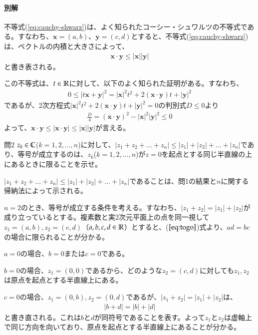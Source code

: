 \paragraph{別解}

不等式(\ref{eq:cauchy-shwarz})は、よく知られたコーシー・シュワルツの不等式である。すなわち、$\bm{x}=(a,b)$、$\bm{y}=(c,d)$とすると、不等式(\ref{eq:cauchy-shwarz})は、ベクトルの内積と大きさによって、
\begin{align}
    \bm{x}\cdot \bm{y}\le|\bm{x}||\bm{y}|\label{eq:cauchy-shwarz0}
\end{align}
と書き表される。

この不等式は、$t\in\mathbb{R}$に対して、以下のよく知られた証明がある。すなわち、
\begin{align*}
    0\le|t\bm{x}+\bm{y}|^2
    =|\bm{x}|^2t^2+2(\bm{x}\cdot\bm{y})t+|\bm{y}|^2
\end{align*}
であるが、2次方程式$|\bm{x}|^2t^2+2(\bm{x}\cdot\bm{y})t+|\bm{y}|^2=0$の判別式$D\le 0$より
\begin{align*}
    \frac{D}{4}=(\bm{x}\cdot\bm{y})^2-|\bm{x}|^2|\bm{y}|^2\le 0
\end{align*}
よって、$\bm{x}\cdot\bm{y}\le|\bm{x}\cdot\bm{y}|\le|\bm{x}||\bm{y}|$が言える。

\begin{mysimplebox}{問2}
    $z_k\in\mathbb{C}$($k=1,2,\dots,n$)に対して、$|z_1+z_2+\dots+z_n|\le|z_1|+|z_2|+\dots+|z_n|$であり、等号が成立するのは、$z_k$($k=1,2,\dots,n$)が$z=0$を起点とする同じ半直線の上にあるときに限ることを示せ。
\end{mysimplebox}

$|z_1+z_2+\dots+z_n|\le|z_1|+|z_2|+\dots+|z_n|$であることは、問1の結果と$n$に関する帰納法によって示される。

$n=2$のとき、等号が成立する条件を考える。すなわち、$|z_1+z_2|=|z_1|+|z_2|$が成り立っているとする。複素数と実2次元平面上の点を同一視して$z_1=(a,b), z_2=(c,d)$（$a,b,c,d\in\mathbb{R}$）とすると、($\ref{eq:togo}$)式より、$ad=bc$の場合に限られることが分かる。

$a=0$の場合、$b=0$または$c=0$である。

$b=0$の場合、$z_1=(0,0)$であるから、どのような$z_2=(c,d)$に対しても$z_1, z_2$は原点を起点とする半直線上にある。

$c=0$の場合、$z_1=(0,b), z_2=(0,d)$であるが、$|z_1+z_2|=|z_1|+|z_2|$は、
\begin{align*}
    |b+d|=|b|+|d|
\end{align*}
と書き直される。これは$b$と$d$が同符号であることを表す。よって$z_1$と$z_2$は虚軸上で同じ方向を向いており、原点を起点とする半直線上にあることが分かる。

